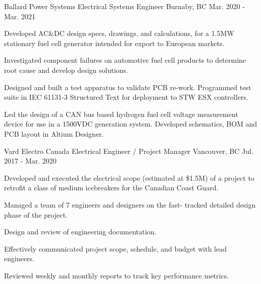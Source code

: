 \begin{cventries}
    \cventry
    {Ballard Power Systems} %
    {Electrical Systems Engineer} %
    {Burnaby, BC} %
    {Mar. 2020 - Mar. 2021} %
    { %
        \begin{cvitems}
            \item {Developed AC\&DC design specs, drawings, and calculations, for a 1.5MW stationary fuel cell generator intended for export to European markets.}
            \item {Investigated component failures on automotive fuel cell products to determine root cause and develop design solutions.}
            \item {Designed and built a test apparatus to validate PCB re-work. Programmed test suite in IEC 61131-3 Structured Text for deployment to STW ESX controllers.}
            \item {Led the design of a CAN bus based hydrogen fuel cell voltage measurement device for use in a 1500VDC generation system. Developed schematics, BOM and PCB layout in Altium Designer.}
        \end{cvitems}
    }

    \cventry
    {Vard Electro Canada} %
    {Electrical Engineer / Project Manager} %
    {Vancouver, BC} %
    {Jul. 2017 - Mar. 2020} %
    { %
        \begin{cvitems}
            \item {Developed and executed the electrical scope (estimated at \$1.5M) of a project to retrofit a class of medium icebreakers for the Canadian Coast Guard.}
            \item {Managed a team of 7 engineers and designers on the fast- tracked detailed design phase of the project.}
            \item {Design and review of engineering documentation.}
            \item {Effectively communicated project scope, schedule, and budget with lead engineers.}
            \item {Reviewed weekly and monthly reports to track key performance metrics.}
        \end{cvitems}
    }


\end{cventries}
